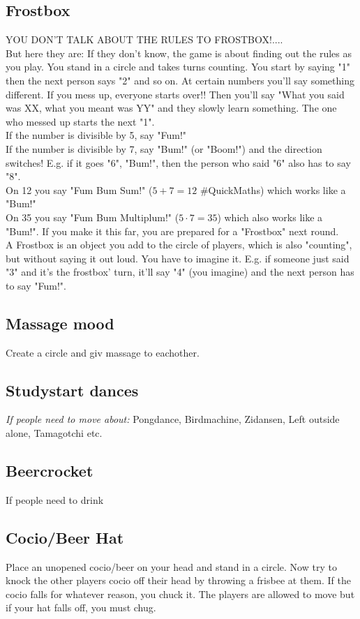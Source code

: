 \documentclass[../../../main.tex]{subfiles}
\begin{document}
\begin{multicols}{2}
\subsection*{Frostbox}
    YOU DON'T TALK ABOUT THE RULES TO FROSTBOX!....\\
    But here they are: If they don't know, the game is about finding out the rules as you play. You stand in a circle and takes turns counting. You start by saying "1" then the next person says "2" and so on. At certain numbers you'll say something different. If you mess up, everyone starts over!! Then you'll say "What you said was XX, what you meant was YY" and they slowly learn something. The one who messed up starts the next "1". \\
    If the number is divisible by 5, say "Fum!"\\
    If the number is divisible by 7, say "Bum!" (or "Boom!") and the direction switches! E.g. if it goes "6", "Bum!", then the person who said "6" also has to say "8". \\
    On 12 you say "Fum Bum Sum!" ($5+7=12$ \#QuickMaths) which works like a "Bum!"\\
    On 35 you say "Fum Bum Multiplum!" ($5\cdot7=35$) which also works like a "Bum!". If you make it this far, you are prepared for a "Frostbox" next round. \\
    A Frostbox is an object you add to the circle of players, which is also "counting", but without saying it out loud. You have to imagine it. E.g. if someone just said "3" and it's the frostbox' turn, it'll say "4" (you imagine) and the next person has to say "Fum!". 


\subsection*{Massage mood}
    Create a circle and giv massage to eachother.


\subsection*{Studystart dances}
    \textit{If people need to move about:}
    Pongdance, Birdmachine, Zidansen, Left outside alone, Tamagotchi etc.
    
\subsection*{Beercrocket}
    If people need to drink

\subsection*{Cocio/Beer Hat}
    Place an unopened cocio/beer on your head and stand in a circle.  Now try to knock the other players cocio off their head by throwing a frisbee at them. If the cocio falls for whatever reason, you chuck it. The players are allowed to move but if your hat falls off, you must chug.


\end{multicols}
\end{document}
